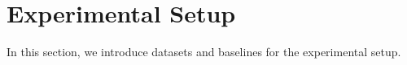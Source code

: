 \section{Experimental Setup}
In this section, we introduce datasets and baselines for the experimental setup.

















